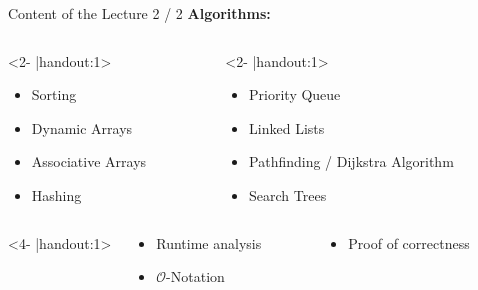 \begin{frame}{Content of the Lecture 2 / 2}
  \textbf{Algorithms:}
  \begin{columns}
    \begin{column}{0.40\textwidth}<2- |handout:1>
      \begin{itemize}
        \item
          Sorting
        \item
          Dynamic Arrays
        \item
          Associative Arrays
        \item
          Hashing
      \end{itemize}
    \end{column}
    \begin{column}{0.60\textwidth}<2- |handout:1>
      \begin{itemize}
        \item
          Priority Queue
        \item
          Linked Lists
        \item
          Pathfinding / Dijkstra Algorithm
        \item
          Search Trees
      \end{itemize}
    \end{column}
  \end{columns}
  \vspace*{2.0em}
  \begin{columns}<4- |handout:1>
    \begin{column}{0.40\textwidth}
      \begin{itemize}
        \item
          Runtime analysis
        \item
          $\mathcal{O}$-Notation
      \end{itemize}
    \end{column}
    \begin{column}{0.60\textwidth}
      \begin{itemize}
        \item
          Proof of correctness
          \vspace*{1.5em}
      \end{itemize}
    \end{column}
  \end{columns}
\end{frame}
